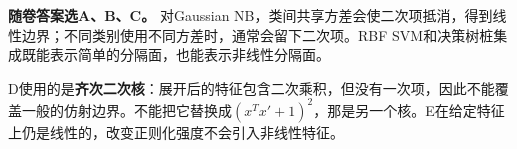 \textbf{随卷答案选A、B、C。} 对Gaussian NB，类间共享方差会使二次项抵消，得到线性边界；不同类别使用不同方差时，通常会留下二次项。RBF SVM和决策树桩集成既能表示简单的分隔面，也能表示非线性分隔面。


D使用的是\textbf{齐次二次核}：展开后的特征包含二次乘积，但没有一次项，因此不能覆盖一般的仿射边界。不能把它替换成\((x^Tx'+1)^2\)，那是另一个核。E在给定特征上仍是线性的，改变正则化强度不会引入非线性特征。
